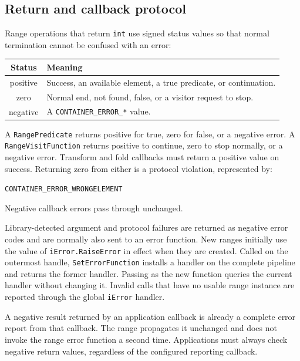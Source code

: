 \subsection{Return and callback protocol}

Range operations that return \verb|int| use signed status values so that normal
termination cannot be confused with an error:

\begin{center}
\begin{tabular}{|c|p{10.5cm}|}
\hline
\textbf{Status} & \textbf{Meaning} \\\hline
positive & Success, an available element, a true predicate, or continuation. \\\hline
zero & Normal end, not found, false, or a visitor request to stop. \\\hline
negative & A \verb|CONTAINER_ERROR_*| value. \\\hline
\end{tabular}
\end{center}

A \verb|RangePredicate| returns positive for true, zero for false, or a
negative error.  A \verb|RangeVisitFunction| returns positive to continue,
zero to stop normally, or a negative error.  Transform and fold callbacks
must return a positive value on success.  Returning zero from either is a
protocol violation, represented by:
\begin{center}
\verb|CONTAINER_ERROR_WRONGELEMENT|
\end{center}
Negative callback errors pass through unchanged.

Library-detected argument and protocol failures are returned as negative error
codes and are normally also sent to an error function.  New ranges initially
use the value of \verb|iError.RaiseError| in effect when they are created.
Called on the outermost handle, \verb|SetErrorFunction| installs a handler on
the complete pipeline and returns the former handler.  Passing \Null as the
new function queries the current handler without changing it.  Invalid calls
that have no usable range instance are reported through the global
\verb|iError| handler.

A negative result returned by an application callback is already a complete
error report from that callback.  The range propagates it unchanged and does
not invoke the range error function a second time.  Applications must always
check negative return values, regardless of the configured reporting callback.

